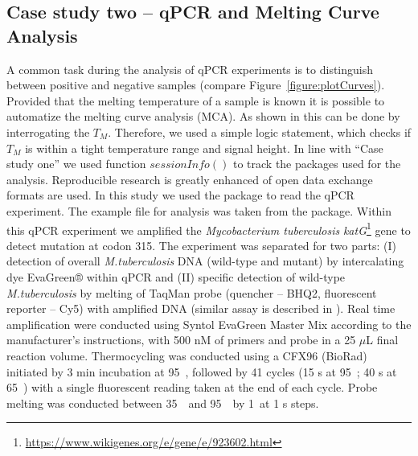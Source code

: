 \subsection{Case study two -- qPCR and Melting Curve Analysis}

A common task during the analysis of qPCR experiments is to distinguish between 
positive and negative samples (compare Figure~\ref{figure:plotCurves}). 
Provided 
that the melting temperature of a sample is known it is possible to automatize 
the melting curve analysis (MCA). As shown in \citet{roediger_RJ_2013} this can 
be done by interrogating the $T_{M}$. Therefore, we used a simple logic 
statement, 
which checks if $T_{M}$ is within a tight temperature range and signal height. 
In line 
with ``Case study one'' we used function $sessionInfo()$ to track the packages 
used 
for the analysis. Reproducible research is greatly enhanced of open data 
exchange formats are used. In this study we used the  package to 
read the qPCR experiment. The example file  for 
analysis was taken from the  package. Within this qPCR experiment 
we amplified the \textit{Mycobacterium tuberculosis} 
\textit{katG}\footnote{\url{https://www.wikigenes.org/e/gene/e/923602.html}} 
gene to detect mutation at codon 315. The experiment was separated for two 
parts: 
(I) detection of overall \textit{M.tuberculosis} DNA (wild-type and mutant) by 
intercalating dye EvaGreen® within qPCR and (II) specific detection of 
wild-type 
\textit{M.tuberculosis} by melting of TaqMan probe (quencher -- BHQ2, 
fluorescent reporter -- Cy5) with amplified DNA (similar assay is described in 
\citet{luo_multiplex_2011}). Real time amplification were conducted using 
Syntol 
EvaGreen Master Mix according to the manufacturer's instructions, with 500 nM 
of 
primers and probe in a 25 $\mu$L final reaction volume. Thermocycling was 
conducted using a CFX96 (BioRad) initiated by 3 min incubation at 
95~\textcelsius, followed by 41 cycles (15 s at 95~\textcelsius; 40 s at 
65~\textcelsius) with a single fluorescent reading taken at the end of each 
cycle. Probe melting was conducted between 35~\textcelsius~and 
95~\textcelsius~by 1~\textcelsius at 1 s steps.
